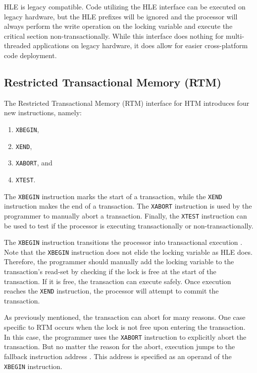 \documentclass[11pt]{book}
\begin{document}
HLE is legacy compatible.  Code utilizing the HLE interface can be executed on legacy
hardware, but the HLE prefixes will be ignored \cite{intel_prog_ref} and the processor
will always perform the write operation on the locking variable and execute the critical
section non-transactionally.  While this interface does nothing for multi-threaded
applications on legacy hardware, it does allow for easier cross-platform code deployment.

\subsection{Restricted Transactional Memory (RTM)}\label{sec:rtm}

The Restricted Transactional Memory (RTM) interface for HTM introduces four new
instructions, namely: 

\vspace*{-\bigskipamount}
\begin{singlespace}
\begin{enumerate}
  \item \texttt{XBEGIN}, 
  \item \texttt{XEND}, 
  \item \texttt{XABORT}, and 
  \item \texttt{XTEST}.
\end{enumerate}
\end{singlespace}

\noindent
The \texttt{XBEGIN} instruction marks the start of a transaction, while the \texttt{XEND}
instruction makes the end of a transaction.  The \texttt{XABORT} instruction is used by
the programmer to manually abort a transaction.  Finally, the \texttt{XTEST} instruction
can be used to test if the processor is executing transactionally or non-transactionally.

The \texttt{XBEGIN} instruction transitions the processor into transactional execution
\cite{intel_prog_ref}.  Note that the \texttt{XBEGIN} instruction does not elide the
locking variable as HLE does.  Therefore, the programmer should manually add the locking
variable to the transaction's read-set by checking if the lock is free at the start of the
transaction.  If it is free, the transaction can execute safely.  Once execution reaches
the \texttt{XEND} instruction, the processor will attempt to commit the transaction.

As previously mentioned, the transaction can abort for many reasons.  One case specific to
RTM occurs when the lock is not free upon entering the transaction.  In this case, the
programmer uses the \texttt{XABORT} instruction to explicitly abort the transaction.  But
no matter the reason for the abort, execution jumps to the fallback instruction address
\cite{intel_prog_ref}.  This address is specified as an operand of the \texttt{XBEGIN}
instruction.
\end{document}
